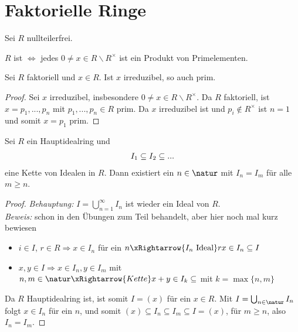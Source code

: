 \section{Faktorielle Ringe}

Sei $R$ nullteilerfrei.

\begin{definition}
	$R$ ist  $\iff$ jedes $0\neq x\in R\backslash R^\times$ ist ein Produkt von Primelementen.
\end{definition}

\begin{lemma}
	Sei $R$ faktoriell und $x\in R$. Ist $x$ irreduzibel, so auch prim.
\end{lemma}
\begin{proof}
	Sei $x$ irreduzibel, insbesondere $0\neq x\in R\backslash R^\times$. Da $R$ faktoriell, ist $x=p_1,...,p_n$ mit $p_1,...,p_n\in R$ prim. Da $x$ irreduzibel ist und $p_i\notin R^\times$ ist $n=1$ und somit $x=p_1$ prim.
\end{proof}

\begin{lemma}
	Sei $R$ ein Hauptidealring und 
	\begin{align}
		I_1\subseteq I_2\subseteq ...\notag
	\end{align}
	eine Kette von Idealen in $R$. Dann existiert ein $n\in\natur$ mit $I_n=I_{m}$ für alle $m\ge n$.
\end{lemma}
\begin{proof}
	\emph{Behauptung:} $I=\bigcup_{n=1}^\infty I_n$ ist wieder ein Ideal von $R$. \\
	\emph{Beweis:} schon in den Übungen zum Teil behandelt, aber hier noch mal kurz bewiesen
	\begin{itemize}
		\item $i\in I$, $r\in R\Rightarrow x\in I_n$ für ein $n\xRightarrow{I_n\text{ Ideal}} rx\in I_n\subseteq I$
		\item $x,y\in I\Rightarrow x\in I_n,y\in I_m$ mit $n,m\in\natur\xRightarrow{Kette} x+y\in I_k\subseteq$ mit $k=\max\{n,m\}$
	\end{itemize}
	Da $R$ Hauptidealring ist, ist somit $I=(x)$ für ein $x\in R$. Mit $I=\bigcup_{n\in\natur} I_n$ folgt $x\in I_n$ für ein $n$, und somit $(x)\subseteq I_n\subseteq I_m\subseteq I=(x)$, für $m\ge n$, also $I_n=I_m$.
\end{proof}

